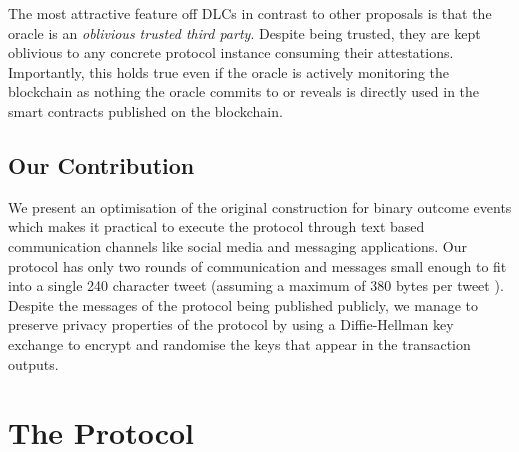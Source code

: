 \documentclass[runningheads]{llncs}
\begin{document}
The most attractive feature off DLCs in contrast to other proposals is that the oracle is an \emph{oblivious trusted third party}\cite{cryptoeprint:2011:319}. Despite being trusted, they are kept oblivious to any concrete protocol instance consuming their attestations. Importantly, this holds true even if the oracle is actively monitoring the blockchain as nothing the oracle commits to or reveals is directly used in the smart contracts published on the blockchain.

\subsection{Our Contribution}

We present an optimisation of the original construction for binary outcome events which makes it practical to execute the protocol through text based communication channels like social media and messaging applications. Our protocol has only two rounds of communication and messages small enough to fit into a single 240 character tweet (assuming a maximum of 380 bytes per tweet \cite{base2048}). Despite the messages of the protocol being published publicly, we manage to preserve privacy properties of the protocol by using a Diffie-Hellman key exchange to encrypt and randomise the keys that appear in the transaction outputs.

\section{The Protocol}
\newcommand{\Rec}{\textsf{Rec}}
\newcommand{\bet}{\beta}
\newcommand{\hatsigma}{\hat{\sigma}}
\newcommand{\Fund}{\textsf{Fund}}
\newcommand{\Outcome}{\textsf{Outcome}}
\newcommand{\KeyGen}{\textsf{KeyGen}}
\newcommand{\win}{\textsf{win}}
\newcommand{\Verify}{\textsf{Vrfy}}
\newcommand{\Tx}{\textsf{Tx}}
\newcommand{\EncVer}{\textsf{EncVrfy}}
\newcommand{\Pdleq}{\pcalgostyle{P}_{\textsf{DLEQ}}}
\newcommand{\Vdleq}{\pcalgostyle{V}_{\textsf{DLEQ}}}
\newcommand{\change}{\textsf{change}}
\newcommand{\val}{\textsf{val}}
\newcommand{\OPCHECKMULTISIG}{\texttt{CHECKMULTISIG}}
\newcommand{\OPCMS}{\texttt{OP\_CMS}_{\text{1-of-2}}}
\newcommand{\fee}{\textsf{fee}}
\newcommand{\Sign}{\textsf{Sign}}
\newcommand{\EncSign}{\textsf{EncSign}}
\newcommand{\Rx}{R_\texttt{x}}
\newcommand{\DecSig}{\textsf{DecSig}}
\newcommand{\TxGen}{\textsf{TxGen}}
\newcommand{\eventid}{\textsf{event\_id}}
\newcommand{\PRG}{\textsf{PRG}}
\newcommand{\HKDF}{H_{\textsf{KDF}}}
\newcommand{\G}{\mathbb{G}}
\newcommand{\Enc}{\textsf{Enc}}
\newcommand{\Dec}{\textsf{Dec}}
\newcommand{\VrfyWitness}{\textsf{VerifyWitness}}
\newcommand{\GenFund}{\textsf{GenFund}}
\newcommand{\GenWitness}{\textsf{Witness}}
\end{document}
